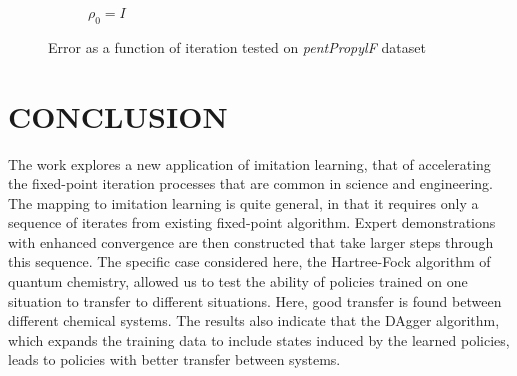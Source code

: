 \documentclass[twoside,11pt]{article}
\begin{document}
\begin{figure}[h!]
\begin{subfigure}{.5\textwidth}
  \caption{$\rho_0 = I$}
  \label{fig:propSubI}
\end{subfigure}
\caption{Error as a function of iteration tested on \textit{pentPropylF} dataset}
\label{fig:testpropSub}
\end{figure}


\section{CONCLUSION}

The work explores a new application of imitation learning, that of accelerating the fixed-point iteration processes that are common in science and engineering. The mapping to imitation learning is quite general, in that it requires only a sequence of iterates from existing fixed-point algorithm. Expert demonstrations with enhanced convergence are then constructed that take larger steps through this sequence. The specific case considered here, the Hartree-Fock algorithm of quantum chemistry, allowed us to test the ability of policies trained on one situation to transfer to different situations. Here, good transfer is found between different chemical systems. The results also indicate that the DAgger algorithm, which expands the training data to include states induced by the learned policies, leads to policies with better transfer between systems.  


\end{document}

